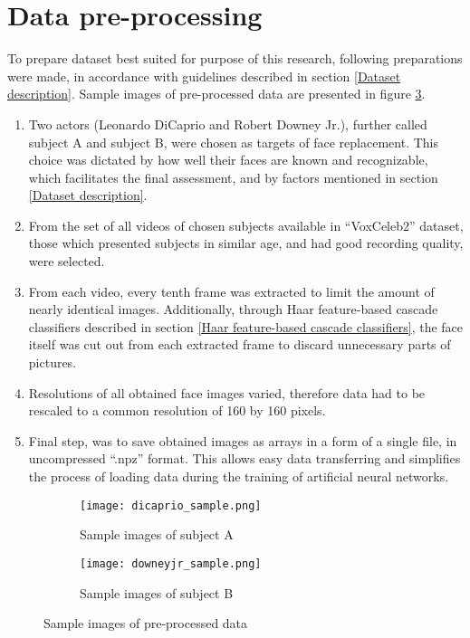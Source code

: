 \section{Data pre-processing}
\label{Data pre-processing}
To prepare dataset best suited for purpose of this research, following preparations were made, in accordance with guidelines described in section \ref{Dataset description}. Sample images of pre-processed data are presented in figure \ref{fig:subjects_sample}.

\begin{enumerate}
\item Two actors (Leonardo DiCaprio and Robert Downey Jr.), further called subject A and subject B, were chosen as targets of face replacement. This choice was dictated by how well their faces are known and recognizable, which facilitates the final assessment, and by factors mentioned in section \ref{Dataset description}.

\item From the set of all videos of chosen subjects available in ``VoxCeleb2'' dataset, those which presented subjects in similar age, and had good recording quality, were selected.

\item From each video, every tenth frame was extracted to limit the amount of nearly identical images. Additionally, through Haar feature-based cascade classifiers described in section \ref{Haar feature-based cascade classifiers}, the face itself was cut out from each extracted frame to discard unnecessary parts of pictures.

\item Resolutions of all obtained face images varied, therefore data had to be rescaled to a common resolution of 160 by 160 pixels.

\item Final step, was to save obtained images as arrays in a form of a single file, in uncompressed ``.npz'' format. This allows easy data transferring and simplifies the process of loading data during the training of artificial neural networks.
\end{enumerate}

\begin{figure}[H]
\centering
\begin{subfigure}{.5\textwidth}
  \centering
  \texttt{[image: dicaprio\_sample.png]}
  \caption{Sample images of subject A}
  \label{subfig:subject_A_sample}
\end{subfigure}%
\begin{subfigure}{.5\textwidth}
  \centering
  \texttt{[image: downeyjr\_sample.png]}
  \caption{Sample images of subject B}
  \label{subfig:subject_B_sample}
\end{subfigure}
\caption{Sample images of pre-processed data}
\label{fig:subjects_sample}
\end{figure}

